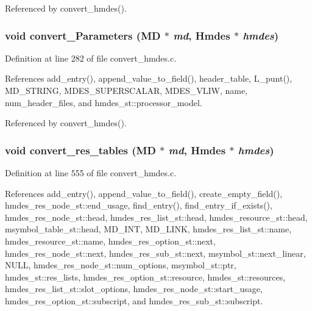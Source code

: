 Referenced by convert\_\-hmdes().
\subsubsection{\setlength{\rightskip}{0pt plus 5cm}void convert\_\-Parameters (\bf{MD} $\ast$ {\em md}, \bf{Hmdes} $\ast$ {\em hmdes})}\label{convert__hmdes_8c_f202962df85bdaaedd37e868417af372}




Definition at line 282 of file convert\_\-hmdes.c.

References add\_\-entry(), append\_\-value\_\-to\_\-field(), header\_\-table, L\_\-punt(), MD\_\-STRING, MDES\_\-SUPERSCALAR, MDES\_\-VLIW, name, num\_\-header\_\-files, and hmdes\_\-st::processor\_\-model.

Referenced by convert\_\-hmdes().
\subsubsection{\setlength{\rightskip}{0pt plus 5cm}void convert\_\-res\_\-tables (\bf{MD} $\ast$ {\em md}, \bf{Hmdes} $\ast$ {\em hmdes})}\label{convert__hmdes_8c_a238ad20977fd84a65677e7c336a7f5a}




Definition at line 555 of file convert\_\-hmdes.c.

References add\_\-entry(), append\_\-value\_\-to\_\-field(), create\_\-empty\_\-field(), hmdes\_\-res\_\-node\_\-st::end\_\-usage, find\_\-entry(), find\_\-entry\_\-if\_\-exists(), hmdes\_\-res\_\-node\_\-st::head, hmdes\_\-res\_\-list\_\-st::head, hmdes\_\-resource\_\-st::head, msymbol\_\-table\_\-st::head, MD\_\-INT, MD\_\-LINK, hmdes\_\-res\_\-list\_\-st::name, hmdes\_\-resource\_\-st::name, hmdes\_\-res\_\-option\_\-st::next, hmdes\_\-res\_\-node\_\-st::next, hmdes\_\-res\_\-sub\_\-st::next, msymbol\_\-st::next\_\-linear, NULL, hmdes\_\-res\_\-node\_\-st::num\_\-options, msymbol\_\-st::ptr, hmdes\_\-st::res\_\-lists, hmdes\_\-res\_\-option\_\-st::resource, hmdes\_\-st::resources, hmdes\_\-res\_\-list\_\-st::slot\_\-options, hmdes\_\-res\_\-node\_\-st::start\_\-usage, hmdes\_\-res\_\-option\_\-st::subscript, and hmdes\_\-res\_\-sub\_\-st::subscript.

